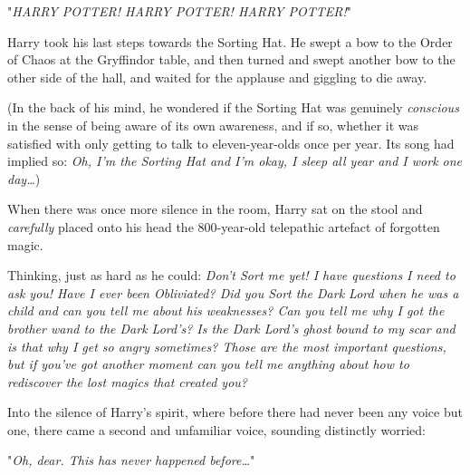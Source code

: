 "\emph{HARRY POTTER! HARRY POTTER! HARRY POTTER!}"

Harry took his last steps towards the Sorting Hat. He swept a bow to the Order 
of Chaos at the Gryffindor table, and then turned and swept another bow to the 
other side of the hall, and waited for the applause and giggling to die away.

(In the back of his mind, he wondered if the Sorting Hat was genuinely 
\emph{conscious} in the sense of being aware of its own awareness, and if so, 
whether it was satisfied with only getting to talk to eleven-year-olds once per 
year. Its song had implied so: \emph{Oh, I'm the Sorting Hat and I'm okay, I 
sleep all year and I work one day{\ldots}})

When there was once more silence in the room, Harry sat on the stool and 
\emph{carefully} placed onto his head the 800-year-old telepathic artefact of 
forgotten magic.

Thinking, just as hard as he could: \emph{Don't Sort me yet! I have questions I 
need to ask you! Have I ever been Obliviated? Did you Sort the Dark Lord when 
he was a child and can you tell me about his weaknesses? Can you tell me why I 
got the brother wand to the Dark Lord's? Is the Dark Lord's ghost bound to my 
scar and is that why I get so angry sometimes? Those are the most important 
questions, but if you've got another moment can you tell me anything about how 
to rediscover the lost magics that created you?}

Into the silence of Harry's spirit, where before there had never been any voice 
but one, there came a second and unfamiliar voice, sounding distinctly worried:

"\emph{Oh, dear. This has never happened before{\ldots}}"
